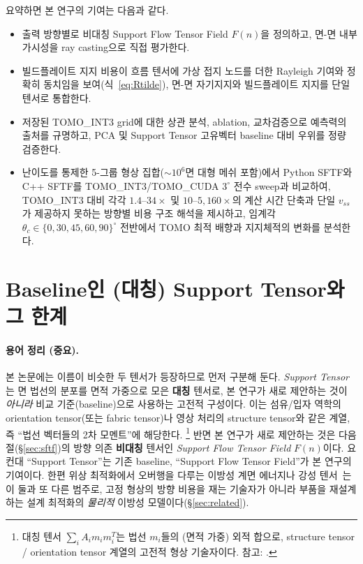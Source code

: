 \documentclass[11pt,a4paper]{article}
\begin{document}
요약하면 본 연구의 기여는 다음과 같다.
\begin{itemize}
\item 출력 방향별로 비대칭 Support Flow Tensor Field $F(n)$을 정의하고, 면-면 내부 가시성을 ray casting으로 직접 평가한다.
\item 빌드플레이트 지지 비용이 흐름 텐서에 가상 접지 노드를 더한 Rayleigh 기여와 정확히 동치임을 보여(식~\eqref{eq:Rtilde}), 면-면 자기지지와 빌드플레이트 지지를 단일 텐서로 통합한다.
\item 저장된 TOMO\_INT3 grid에 대한 상관 분석, ablation, 교차검증으로 예측력의 출처를 규명하고, PCA 및 Support Tensor 고유벡터 baseline 대비 우위를 정량 검증한다.
\item 난이도를 통제한 5-그룹 형상 집합($\sim$$10^6$면 대형 메쉬 포함)에서 Python SFTF와 C++ SFTF를 TOMO\_INT3/TOMO\_CUDA $3^\circ$ 전수 sweep과 비교하여, TOMO\_INT3 대비 각각 $1.4$--$34\times$ 및 $10$--$5{,}160\times$의 계산 시간 단축과 단일 $v_{ss}$가 제공하지 못하는 방향별 비용 구조 해석을 제시하고, 임계각 $\theta_c\in\{0,30,45,60,90\}^\circ$ 전반에서 TOMO 최적 배향과 지지체적의 변화를 분석한다.
\end{itemize}

\section{Baseline인 (대칭) Support Tensor와 그 한계}
\label{sec:support-tensor-limit}

\paragraph{용어 정리 (중요).}
본 논문에는 이름이 비슷한 두 텐서가 등장하므로 먼저 구분해 둔다.
\emph{Support Tensor}는 면 법선의 분포를 면적 가중으로 모은 \textbf{대칭} 텐서로,
본 연구가 새로 제안하는 것이 \emph{아니라} 비교 기준(baseline)으로 사용하는 고전적 구성이다.
이는 섬유/입자 역학의 orientation tensor(또는 fabric tensor)나
영상 처리의 structure tensor와 같은 계열, 즉 ``법선 벡터들의 2차 모멘트''에 해당한다.%
\footnote{대칭 텐서 $\sum_i A_i m_i m_i^T$는 법선 $m_i$들의 (면적 가중) 외적 합으로, structure
tensor / orientation tensor 계열의 고전적 형상 기술자이다.
참고: \cite{kanatani1984}.}
반면 본 연구가 새로 제안하는 것은 다음 절(\S\ref{sec:sftf})의 방향 의존 \textbf{비대칭}
텐서인 \emph{Support Flow Tensor Field} $F(n)$이다.
요컨대 ``Support Tensor''는 기존 baseline, ``Support Flow Tensor Field''가 본 연구의 기여이다.
한편 위상 최적화에서 오버행을 다루는 이방성 계면 에너지나 강성 텐서~\cite{garcke2023,shin2025}는
이 둘과 또 다른 범주로, 고정 형상의 방향 비용을 재는 기술자가 아니라
부품을 재설계하는 설계 최적화의 \emph{물리적} 이방성 모델이다(\S\ref{sec:related}).
\end{document}

